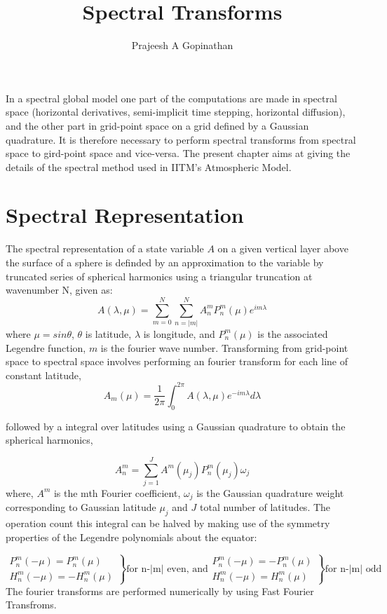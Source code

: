 \documentclass{SBCbookchapter}
\author{Prajeesh A Gopinathan}
\title{Spectral Transforms}
\begin{document}
\maketitle

In a spectral global model one part of the computations are made in spectral space (horizontal derivatives, semi-implicit time stepping, horizontal diffusion), and the other part in grid-point space on a grid defined by a Gaussian quadrature. It is therefore necessary to perform spectral transforms from spectral space to gird-point space and vice-versa. The present chapter aims at giving the details of the spectral method used in IITM's Atmospheric Model.

\section{Spectral Representation}
The spectral representation of a state variable $A$ on a given vertical layer above the surface of a sphere is definded by an approximation to the variable by truncated series of spherical harmonics using a triangular truncation at wavenumber N, given as:
\begin{equation}
A(\lambda,\mu) = \sum_{m=0}^N \sum_{n=|m|}^{N} A_{n}^{m} P_{n}^{m} (\mu) e^{im\lambda}
\end{equation}
 where $\mu=sin\theta$, $\theta$ is latitude, $\lambda$ is longitude, and $P_{n}^{m}(\mu)$ is the associated Legendre function, $m$ is the fourier wave number.
Transforming from grid-point space to spectral space involves performing an fourier transform for each line of constant latitude, 
\begin{equation}
A_{m}(\mu) = \frac{1}{2\pi} \int_{0}^{2\pi} A(\lambda,\mu) e^{-im\lambda} d\lambda
\end{equation}

followed by a integral over latitudes using a Gaussian quadrature to obtain the spherical harmonics,

\begin{equation}
A_{n}^{m} = \sum_{j=1}^{J} A^{m}(\mu_j)P_{n}^{m}(\mu_j) \omega_j
\end{equation}
where, $A^m$ is the mth Fourier coefficient, $\omega_j$ is the Gaussian quadrature weight corresponding to Gaussian latitude $\mu_j$ and $J$ total number of latitudes. The operation count this integral can be halved by making use of the symmetry properties of the Legendre polynomials about the equator:

\begin{equation}
\left.
\begin{array}{ll}
P_n^m(-\mu) = P_n^m(\mu)\\
H_n^m(-\mu) = -H_n^m(\mu)
\end{array}
\right\} \text{for n-|m| even, and}
\left.
\begin{array}{ll}
P_n^m(-\mu) = -P_n^m(\mu)\\
H_n^m(-\mu) = H_n^m(\mu)
\end{array} 
\right\} \text{for n-|m| odd}
\label{eqn_sym}
\end{equation}
The fourier transforms are performed numerically by using Fast Fourier Transfroms.
\end{document}

